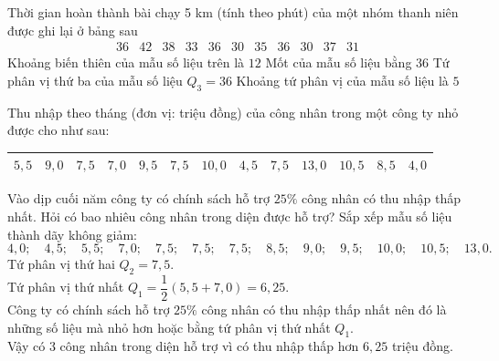 \begin{ex}%
	Thời gian hoàn thành bài chạy 5 km (tính theo phút) của một nhóm thanh niên được ghi lại ở bảng sau
	$$\begin{array}{lllllllllll}
		36 & 42 & 38 & 33 & 36 & 30 & 35 & 36 & 30 & 37 & 31
	\end{array}$$
	\choiceTF
	{\True Khoảng biến thiên của mẫu số liệu trên là $12$}
	{\True Mốt của mẫu số liệu bằng $36$}
	{Tứ phân vị thứ ba của mẫu số liệu $Q_3=36$}
	{Khoảng tứ phân vị của mẫu số liệu là $5$}
\end{ex}

\begin{bt}%
	Thu nhập theo tháng (đơn vị: triệu đồng) của công nhân trong một công ty nhỏ được cho như sau:
	\begin{center}
		\begin{tabular}{|l|l|l|l|l|l|l|l|l|l|l|l|l|}
		\hline $5{,}5$ & $9{,}0$ & $7{,}5$ & $7{,}0$ & $9{,}5$ & $7{,}5$ & $10{,}0$ & $4{,}5$ & $7{,}5$ & $13{,}0$ & $10{,}5$ & $8{,}5$ & $4{,}0$ \\
		\hline
	\end{tabular}
	\end{center}
	Vào dịp cuối năm công ty có chính sách hỗ trợ $25 \%$ công nhân có thu nhập thấp nhất. Hỏi có bao nhiêu công nhân trong diện được hỗ trợ?
	\loigiai
	{
	Sắp xếp mẫu số liệu thành dãy không giảm:
	$$
	4{,}0;\quad 4{,}5;\quad 5{,}5;\quad 7{,}0;\quad 7{,}5;\quad 7{,}5;\quad 7{,}5;\quad 8{,}5;\quad 9{,}0;\quad 9{,}5;\quad 10{,}0;\quad 10{,}5;\quad 13{,}0.
	$$
	Tứ phân vị thứ hai $Q_2=7{,}5$.\\
	Tứ phân vị thứ nhất $Q_1=\dfrac{1}{2}(5{,}5+7{,}0)=6{,}25$.\\
	Công ty có chính sách hỗ trợ $25 \%$ công nhân có thu nhập thấp nhất nên đó là những số liệu mà nhỏ hơn hoặc bằng tứ phân vị thứ nhất $Q_1$.\\
	Vậy có 3 công nhân trong diện hỗ trợ vì có thu nhập thấp hơn $6{,}25$ triệu đồng.	
	}
\end{bt}

